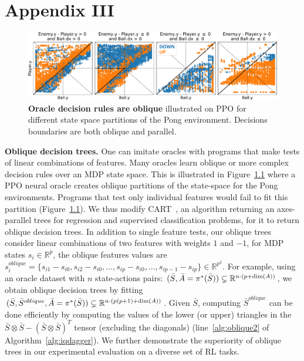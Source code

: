 \chapter{Appendix III}
\label{chap-app-imit}
\begin{figure}[b]
    \centering
    \includegraphics[width=1.\textwidth]{images/images_part3/pong_state_space.pdf}
    \caption{\textbf{Oracle decision rules are oblique} illustrated on PPO for different state space partitions of the Pong environment. Decisions boundaries are both oblique and parallel.}
    \label{fig:pong_states}
\end{figure}

\textbf{Oblique decision trees.} One can imitate oracles with programs that make tests of linear combinations of features. Many oracles learn oblique or more complex decision rules over an MDP state space. This is illustrated in Figure~\ref{fig:pong_states} where a PPO neural oracle creates oblique partitions of the state-space for the Pong environments. Programs that test only individual features would fail to fit this partition (\cf Figure~\ref{fig:pong_states}). 
We thus modify CART~\citep{breiman}, an algorithm returning an axes-parallel trees for regression and supervised classification problems, for it to return oblique decision trees. 
In addition to single feature tests, our oblique trees consider linear combinations of two features with weights $1$ and $-1$, \eg\@ for MDP states $s_i \in \mathbb{R}^{p}$, the oblique features values are $s^{oblique}_i = \{s_{i1} - s_{i0}, s_{i2} - s_{i0}, ..., s_{ip} - s_{i0}, ...,s_{ip-1} - s_{ip}\} \in \mathbb{R}^{p^2}$. For example, using an oracle dataset with $n$ state-actions pairs: $(\bar{S}, \Bar{A} = \pi^{*}(\bar{S})) \subsetneq \mathbb{R}^{n\cdot(p+\dim(A))}$, we obtain oblique decision trees by fitting $(\bar{S},\bar{S}^{oblique} , \Bar{A} = \pi^{*}(\bar{S})) \subsetneq \mathbb{R}^{n\cdot(p(p+1)+\dim(A))}$. 
Given $\bar{S}$, computing $\bar{S}^{oblique}$ can be done efficiently by computing the values of the lower (or upper) triangles in the $\bar{S} \otimes \bar{S} - (\bar{S} \otimes \bar{S})^T$ tensor (excluding the diagonals) (\cf line~\ref{alg:oblique2} of Algorithm~\ref{alg:iqdagger}). We further demonstrate the superiority of oblique trees in our experimental evaluation on a diverse set of RL tasks.